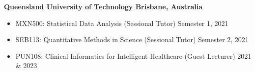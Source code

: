 \textbf{Queensland University of Technology \hfill Brisbane, Australia}\par
\begin{itemize}
	\item MXN500: Statistical Data Analysis (Sessional Tutor) \hfill Semester 1, 2021
	\item SEB113: Quantitative Methods in Science (Sessional Tutor) \hfill Semester 2, 2021
    \item PUN108: Clinical Informatics for Intelligent Healthcare (Guest Lecturer) \hfill 2021 & 2023\par

\end{itemize}\par